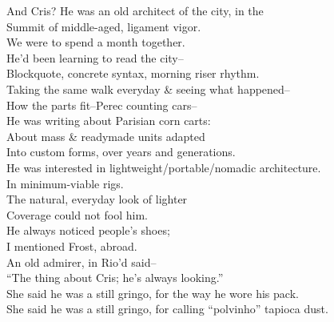 And Cris? He was an old architect of the city, in the \\
Summit of middle-aged, ligament vigor. \\
We were to spend a month together. \\
He'd been learning to read the city-- \\
Blockquote, concrete syntax, morning riser rhythm. \\
Taking the same walk everyday \& seeing what happened-- \\
How the parts fit--Perec counting cars-- \\
He was writing about Parisian corn carts: \\
About mass \& readymade units adapted \\
Into custom forms, over years and generations. \\
He was interested in lightweight/portable/nomadic architecture. \\
In minimum-viable rigs. \\
The natural, everyday look of lighter \\
Coverage could not fool him. \\
He always noticed people's shoes; \\
I mentioned Frost, abroad. \\
An old admirer, in Rio'd said-- \\
\qquad ``The thing about Cris; he's always looking.'' \\
She said he was a still gringo, for the way he wore his pack. \\
She said he was a still gringo, for calling ``polvinho'' tapioca dust. \\
